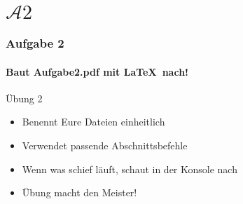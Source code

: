\section{$\mathcal{A}2$} 
\begin{frame}
\frametitle{Aufgabe 2}
\framesubtitle{Baut Aufgabe2.pdf mit \LaTeX ~nach!} 

\begin{block}{\"Ubung 2}
\begin{itemize}
  \item Benennt Eure Dateien einheitlich
  \item Verwendet passende Abschnittsbefehle
  \item Wenn was schief l\"auft, schaut in der Konsole nach
  \item \"Ubung macht den Meister!
\end{itemize}
\end{block}
\end{frame}